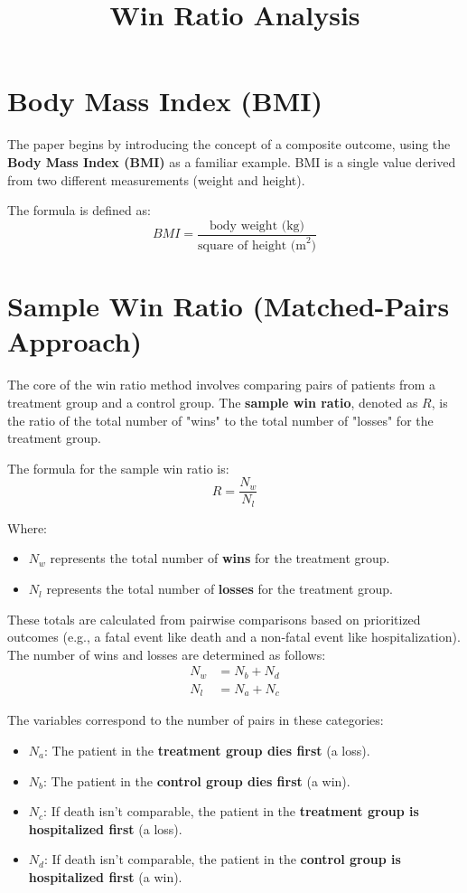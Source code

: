\documentclass{article}
\title{Win Ratio Analysis}
\author{}
\date{}
\begin{document}
\maketitle

\section{Body Mass Index (BMI)}

The paper begins by introducing the concept of a composite outcome, using the \textbf{Body Mass Index (BMI)} as a familiar example. BMI is a single value derived from two different measurements (weight and height).

The formula is defined as:
\begin{equation}
BMI = \frac{\text{body weight (kg)}}{\text{square of height (m}^2\text{)}}
\end{equation}

\section{Sample Win Ratio (Matched-Pairs Approach)}

The core of the win ratio method involves comparing pairs of patients from a treatment group and a control group. The \textbf{sample win ratio}, denoted as $R$, is the ratio of the total number of "wins" to the total number of "losses" for the treatment group.

The formula for the sample win ratio is:
\begin{equation}
R = \frac{N_w}{N_l}
\end{equation}

Where:
\begin{itemize}
    \item $N_w$ represents the total number of \textbf{wins} for the treatment group.
    \item $N_l$ represents the total number of \textbf{losses} for the treatment group.
\end{itemize}

These totals are calculated from pairwise comparisons based on prioritized outcomes (e.g., a fatal event like death and a non-fatal event like hospitalization). The number of wins and losses are determined as follows:
\begin{align}
N_w &= N_b + N_d \\
N_l &= N_a + N_c
\end{align}

The variables correspond to the number of pairs in these categories:
\begin{itemize}
    \item $N_a$: The patient in the \textbf{treatment group dies first} (a loss).
    \item $N_b$: The patient in the \textbf{control group dies first} (a win).
    \item $N_c$: If death isn't comparable, the patient in the \textbf{treatment group is hospitalized first} (a loss).
    \item $N_d$: If death isn't comparable, the patient in the \textbf{control group is hospitalized first} (a win).
\end{itemize}
\end{document}
